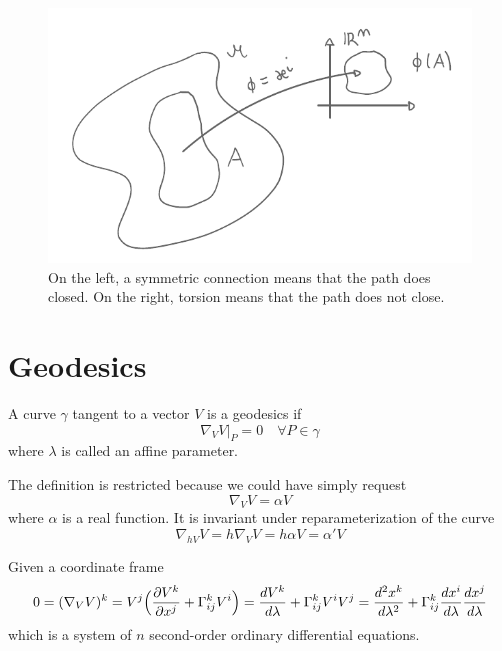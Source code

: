     \begin{figure}[h!]
        \centering
        \includegraphics{chart.pdf}
        \caption{On the left, a symmetric connection means that the path does closed. On the right, torsion means that the path does not close.}\label{fig:tors}
    \end{figure}

\section{Geodesics}

    \begin{definition}[Geodesics]
        A curve $\gamma$ tangent to a vector $V$ is a geodesics if 
        \begin{equation*}
            \nabla_V V \vert_P = 0 \quad \forall P \in \gamma
        \end{equation*}
        where $\lambda$ is called an affine parameter. 
    \end{definition}

    The definition is restricted because we could have simply request 
    \begin{equation*}
        \nabla_V V = \alpha V
    \end{equation*}
    where $\alpha$ is a real function. It is invariant under reparameterization of the curve 
    \begin{equation*}
        \nabla_{h V} V = h \nabla_V V = h \alpha V = \alpha' V
    \end{equation*}

    Given a coordinate frame 
    \begin{equation*}
        0 = (\nabla_V V)^k = V^j \Big( \frac{\partial V^k}{\partial x^j} + \Gamma^k_{ij} V^i \Big) = \frac{dV^k}{d\lambda} + \Gamma^k_{ij} V^i V^j = \frac{d^2x^k}{d\lambda^2} + \Gamma^k_{ij} \frac{dx^i}{d\lambda} \frac{dx^j}{d\lambda}
    \end{equation*}
    which is a system of $n$ second-order ordinary differential equations. 

